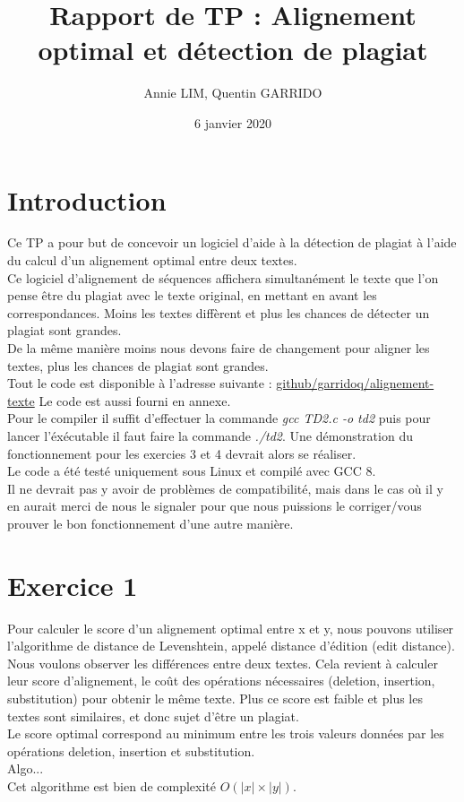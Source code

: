 \documentclass{article}
\title{Rapport de TP : Alignement optimal et détection de plagiat}
\author{Annie LIM, Quentin GARRIDO}
\date{6 janvier 2020}
\begin{document}
\maketitle
\tableofcontents
\pagebreak

\section{Introduction}

Ce TP a pour but de concevoir un logiciel d'aide à la détection de plagiat à
l'aide du calcul d'un alignement optimal entre deux textes.\\
Ce logiciel d'alignement de séquences affichera simultanément le texte que l'on
pense être du plagiat avec le texte original, en mettant en avant les correspondances.
Moins les textes diffèrent et plus les chances de détecter un plagiat sont
grandes.\\
De la même manière moins nous devons faire de changement pour aligner les
textes, plus les chances de plagiat sont grandes.\\

Tout le code est disponible à l'adresse suivante :
\href{https://github.com/garridoq/alignement-texte}{github/garridoq/alignement-texte}
Le code est aussi fourni en annexe.\\

Pour le compiler il suffit d'effectuer la commande \textit{gcc TD2.c -o td2}
puis pour lancer l'éxécutable il faut faire la commande \textit{./td2}.
Une démonstration du fonctionnement pour les exercies 3 et 4 devrait alors se
réaliser.\\

Le code a été testé uniquement sous Linux et compilé avec GCC 8.\\
Il ne devrait pas y avoir de problèmes de compatibilité, mais dans le cas où il
y en aurait merci de nous le signaler pour que nous puissions le corriger/vous
prouver le bon fonctionnement d'une autre manière. 

\section{Exercice 1}

Pour calculer le score d'un alignement optimal entre x et y, nous pouvons utiliser l'algorithme de distance de Levenshtein, appelé distance d'édition (edit distance).\\
Nous voulons observer les différences entre deux textes. Cela revient à calculer leur score d'alignement, le coût des opérations nécessaires (deletion, insertion, substitution) pour obtenir le même texte. Plus ce score est faible et plus les textes sont similaires, et donc sujet d'être un plagiat.\\
Le score optimal correspond au minimum entre les trois valeurs données par les opérations deletion, insertion et substitution. \\
Algo...\\
Cet algorithme est bien de complexité $O(\lvert x\rvert \times \lvert y\rvert)$.
\end{document}
